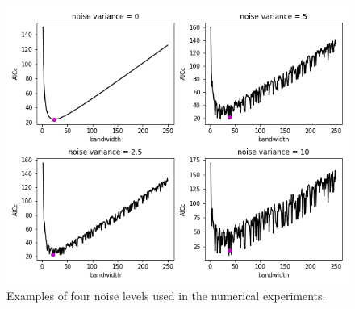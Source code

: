 \documentclass[letterpaper,12pt,twocolumn]{article}
\begin{document}
\begin{figure}
    \centering
    \includegraphics[width=\textwidth]{../figures/noisy-curves.png}
    \caption{Examples of four noise levels used in the numerical experiments.}
    \label{fig:noisy-curves}
\end{figure}
\end{document}
